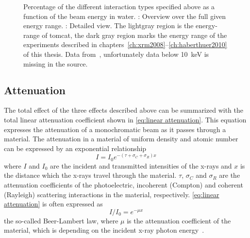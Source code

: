 \def\width{0.5\linewidth}%
\def\height{0.309\linewidth}%
\begin{figure}
	\noindent{}%
	\caption[Interaction types]{Percentage of the different interaction types specified above as a function of the beam energy in water. : Overview over the full given energy range. : Detailed view. The lightgray region is the energy-range of \ac{tomcat}, the dark gray region marks the energy range of the experiments described in chapters~\ref{ch:xrm2008}--\ref{ch:haberthuer2010} of this thesis. Data from~\citet[Table 5-5]{Johns1983}, unfortunately data below \SI{10}{\kilo\electronvolt} is missing in the source.}%
	\label{fig:InteractionPercentage}%
\end{figure}

\subsection{Attenuation}
The total effect of the three effects described above can be summarized with the total linear attenuation coefficient shown in \autoref{eq:linear attenuation}. This equation expresses the attenuation of a monochromatic beam as it passes through a material. The attenuation in a material of uniform density and atomic number can be expressed by an exponential relationship%
\begin{equation}%
	I=I_{0}e^{-(\tau+\sigma_{C}+\sigma_{R})x}%
	\label{eq:linear attenuation}%
\end{equation}%
where $I$ and $I_{0}$ are the incident and transmitted intensities of the x-rays and $x$ is the distance which the x-rays travel through the material. $\tau$, $\sigma_{C}$ and $\sigma_{R}$ are the attenuation coefficients of the photoelectric, incoherent (Compton) and coherent (Rayleigh) scattering interactions in the material, respectively. \autoref{eq:linear attenuation} is often expressed as
\begin{equation}
	I/I_{0}=e^{-\mu x}
	\label{eq:beer-lambert}
\end{equation}%
the so-called Beer-Lambert law, where $\mu$ is the attenuation coefficient of the material, which is depending on the incident x-ray photon energy~\cite{Hsieh2003}. 

